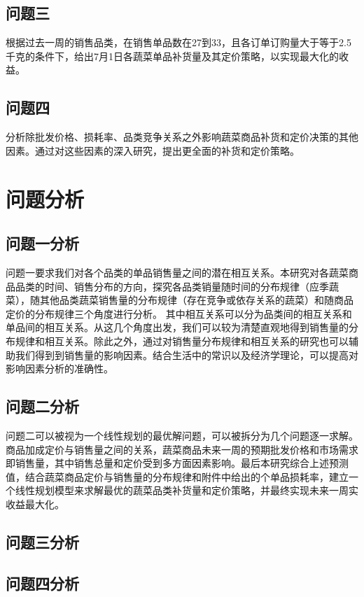 \documentclass{article}
\begin{document}
\subsection{问题三}

根据过去一周的销售品类，在销售单品数在27到33，且各订单订购量大于等于2.5千克的条件下，给出7月1日各蔬菜单品补货量及其定价策略，以实现最大化的收益。
\subsection{问题四}

分析除批发价格、损耗率、品类竞争关系之外影响蔬菜商品补货和定价决策的其他因素。通过对这些因素的深入研究，提出更全面的补货和定价策略。
\section{问题分析}

\subsection{问题一分析}
问题一要求我们对各个品类的单品销售量之间的潜在相互关系。本研究对各蔬菜商品品类的时间、销售分布的方向，探究各品类销量随时间的分布规律（应季蔬菜），随其他品类蔬菜销售量的分布规律（存在竞争或依存关系的蔬菜）和随商品定价的分布规律三个角度进行分析。
其中相互关系可以分为品类间的相互关系和单品间的相互关系。从这几个角度出发，我们可以较为清楚直观地得到销售量的分布规律和相互关系。除此之外，通过对销售量分布规律和相互关系的研究也可以辅助我们得到到销售量的影响因素。结合生活中的常识以及经济学理论，可以提高对影响因素分析的准确性。

\subsection{问题二分析}
问题二可以被视为一个线性规划的最优解问题，可以被拆分为几个问题逐一求解。商品加成定价与销售量之间的关系，蔬菜商品未来一周的预期批发价格和市场需求即销售量，其中销售总量和定价受到多方面因素影响。最后本研究综合上述预测值，结合蔬菜商品定价与销售量的分布规律和附件中给出的个单品损耗率，建立一个线性规划模型来求解最优的蔬菜品类补货量和定价策略，并最终实现未来一周实收益最大化。

\subsection{问题三分析}

\subsection{问题四分析}
\end{document}
